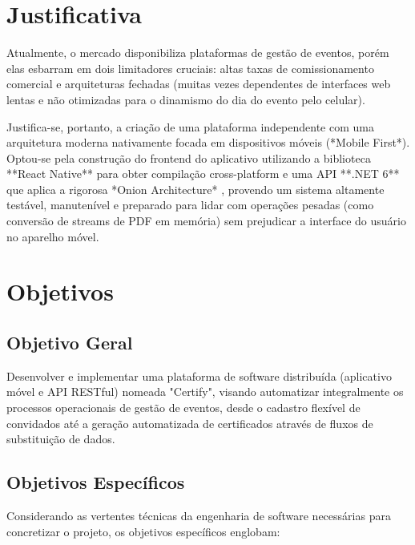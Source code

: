\section{Justificativa}

Atualmente, o mercado disponibiliza plataformas de gestão de eventos, porém elas esbarram em dois limitadores cruciais: altas taxas de comissionamento comercial e arquiteturas fechadas (muitas vezes dependentes de interfaces web lentas e não otimizadas para o dinamismo do dia do evento pelo celular).

Justifica-se, portanto, a criação de uma plataforma independente com uma arquitetura moderna nativamente focada em dispositivos móveis (*Mobile First*). Optou-se pela construção do frontend do aplicativo utilizando a biblioteca **React Native** para obter compilação cross-platform e uma API **.NET 6** que aplica a rigorosa *Onion Architecture* \cite{dotnet}, provendo um sistema altamente testável, manutenível e preparado para lidar com operações pesadas (como conversão de streams de PDF em memória) sem prejudicar a interface do usuário no aparelho móvel.

\section{Objetivos}

\subsection{Objetivo Geral}
Desenvolver e implementar uma plataforma de software distribuída (aplicativo móvel e API RESTful) nomeada "Certify", visando automatizar integralmente os processos operacionais de gestão de eventos, desde o cadastro flexível de convidados até a geração automatizada de certificados através de fluxos de substituição de dados.

\subsection{Objetivos Específicos}
Considerando as vertentes técnicas da engenharia de software necessárias para concretizar o projeto, os objetivos específicos englobam:

